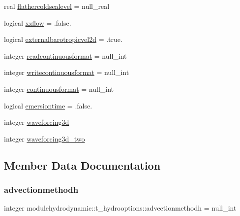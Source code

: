 \begin{DoxyCompactItemize}
real \mbox{\hyperlink{structmodulehydrodynamic_1_1t__hydrooptions_a6c16e7d37f6f612391ef5ff378ece04e}{flathercoldsealevel}} = null\+\_\+real
\item 
logical \mbox{\hyperlink{structmodulehydrodynamic_1_1t__hydrooptions_af920a925dde12970cc43309010e38c73}{xzflow}} = .false.
\item 
logical \mbox{\hyperlink{structmodulehydrodynamic_1_1t__hydrooptions_afbb26fc546b2d51316b0b5441c89ff7e}{externalbarotropicvel2d}} = .true.
\item 
integer \mbox{\hyperlink{structmodulehydrodynamic_1_1t__hydrooptions_afc15fe411c49c762559eed4ffe2b689f}{readcontinuousformat}} = null\+\_\+int
\item 
integer \mbox{\hyperlink{structmodulehydrodynamic_1_1t__hydrooptions_a6e106e1a2a81c0ceb0a41cd68a93bf28}{writecontinuousformat}} = null\+\_\+int
\item 
integer \mbox{\hyperlink{structmodulehydrodynamic_1_1t__hydrooptions_a3f96977583a51effd26abea5545211a0}{continuousformat}} = null\+\_\+int
\item 
logical \mbox{\hyperlink{structmodulehydrodynamic_1_1t__hydrooptions_ad34a1b6ada380c7cf43f244640e95456}{emersiontime}} = .false.
\item 
integer \mbox{\hyperlink{structmodulehydrodynamic_1_1t__hydrooptions_a49d1b71d77774d4fd671f95bf66f0708}{waveforcing3d}}
\item 
integer \mbox{\hyperlink{structmodulehydrodynamic_1_1t__hydrooptions_ae79ade8eb2b714fec01b4657a1bb3c42}{waveforcing3d\+\_\+two}}
\end{DoxyCompactItemize}


\subsection{Member Data Documentation}
\mbox{\label{structmodulehydrodynamic_1_1t__hydrooptions_a11d668915273778c7e28d5024813f1e5}} 
\subsubsection{\texorpdfstring{advectionmethodh}{advectionmethodh}}
{\footnotesize\ttfamily integer modulehydrodynamic\+::t\+\_\+hydrooptions\+::advectionmethodh = null\+\_\+int\hspace{0.3cm}{\ttfamily [private]}}

